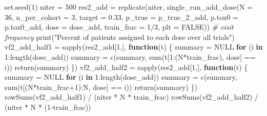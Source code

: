\documentclass[
]{article}
\newenvironment{Shaded}{\begin{snugshade}}{\end{snugshade}}
\newcommand{\AttributeTok}[1]{\textcolor[rgb]{0.77,0.63,0.00}{#1}}
\newcommand{\CommentTok}[1]{\textcolor[rgb]{0.56,0.35,0.01}{\textit{#1}}}
\newcommand{\ConstantTok}[1]{\textcolor[rgb]{0.00,0.00,0.00}{#1}}
\newcommand{\ControlFlowTok}[1]{\textcolor[rgb]{0.13,0.29,0.53}{\textbf{#1}}}
\newcommand{\DecValTok}[1]{\textcolor[rgb]{0.00,0.00,0.81}{#1}}
\newcommand{\FloatTok}[1]{\textcolor[rgb]{0.00,0.00,0.81}{#1}}
\newcommand{\FunctionTok}[1]{\textcolor[rgb]{0.00,0.00,0.00}{#1}}
\newcommand{\NormalTok}[1]{#1}
\newcommand{\OtherTok}[1]{\textcolor[rgb]{0.56,0.35,0.01}{#1}}
\newcommand{\SpecialCharTok}[1]{\textcolor[rgb]{0.00,0.00,0.00}{#1}}
\newcommand{\StringTok}[1]{\textcolor[rgb]{0.31,0.60,0.02}{#1}}
\begin{document}
\begin{Shaded}
\begin{Highlighting}[]
\FunctionTok{set.seed}\NormalTok{(}\DecValTok{1}\NormalTok{)}
\NormalTok{niter }\OtherTok{=} \DecValTok{500}
\NormalTok{res2\_add }\OtherTok{=} \FunctionTok{replicate}\NormalTok{(niter, }\FunctionTok{single\_run\_add\_dose}\NormalTok{(}\AttributeTok{N =} \DecValTok{36}\NormalTok{, }\AttributeTok{n\_per\_cohort =} \DecValTok{3}\NormalTok{, }\AttributeTok{target =} \FloatTok{0.33}\NormalTok{, }\AttributeTok{p\_true =}\NormalTok{ p\_true\_2\_add, }\AttributeTok{p.tox0 =}\NormalTok{ p.tox0\_add, }\AttributeTok{dose =}\NormalTok{ dose\_add, }\AttributeTok{train\_frac =} \DecValTok{1}\SpecialCharTok{/}\DecValTok{3}\NormalTok{, }\AttributeTok{plt =} \ConstantTok{FALSE}\NormalTok{))}
\CommentTok{\# visit frequency}
\FunctionTok{print}\NormalTok{(}\StringTok{"Percent of patients assigned to each dose over all trials"}\NormalTok{)}
\NormalTok{vf2\_add\_half1 }\OtherTok{=} \FunctionTok{sapply}\NormalTok{(res2\_add[}\DecValTok{1}\NormalTok{,], }\ControlFlowTok{function}\NormalTok{(t) \{}
\NormalTok{summary }\OtherTok{=} \ConstantTok{NULL}
\ControlFlowTok{for}\NormalTok{ (i }\ControlFlowTok{in} \DecValTok{1}\SpecialCharTok{:}\FunctionTok{length}\NormalTok{(dose\_add)) summary }\OtherTok{=} \FunctionTok{c}\NormalTok{(summary, }\FunctionTok{sum}\NormalTok{(t[}\DecValTok{1}\SpecialCharTok{:}\NormalTok{(N}\SpecialCharTok{*}\NormalTok{train\_frac), }\StringTok{\textquotesingle{}dose\textquotesingle{}}\NormalTok{] }\SpecialCharTok{==}\NormalTok{ i))}
\FunctionTok{return}\NormalTok{(summary)}
\NormalTok{\})}
\NormalTok{vf2\_add\_half2 }\OtherTok{=} \FunctionTok{sapply}\NormalTok{(res2\_add[}\DecValTok{1}\NormalTok{,], }\ControlFlowTok{function}\NormalTok{(t) \{}
\NormalTok{summary }\OtherTok{=} \ConstantTok{NULL}
\ControlFlowTok{for}\NormalTok{ (i }\ControlFlowTok{in} \DecValTok{1}\SpecialCharTok{:}\FunctionTok{length}\NormalTok{(dose\_add)) summary }\OtherTok{=} \FunctionTok{c}\NormalTok{(summary, }\FunctionTok{sum}\NormalTok{(t[(N}\SpecialCharTok{*}\NormalTok{train\_frac}\SpecialCharTok{+}\DecValTok{1}\NormalTok{)}\SpecialCharTok{:}\NormalTok{N, }\StringTok{\textquotesingle{}dose\textquotesingle{}}\NormalTok{] }\SpecialCharTok{==}\NormalTok{ i))}
\FunctionTok{return}\NormalTok{(summary)}
\NormalTok{\})}
\FunctionTok{rowSums}\NormalTok{(vf2\_add\_half1) }\SpecialCharTok{/}\NormalTok{ (niter }\SpecialCharTok{*}\NormalTok{ N }\SpecialCharTok{*}\NormalTok{ train\_frac)}
\FunctionTok{rowSums}\NormalTok{(vf2\_add\_half2) }\SpecialCharTok{/}\NormalTok{ (niter }\SpecialCharTok{*}\NormalTok{ N }\SpecialCharTok{*}\NormalTok{ (}\DecValTok{1}\SpecialCharTok{{-}}\NormalTok{train\_frac))}

\end{Highlighting}
\end{Shaded}
\end{document}
